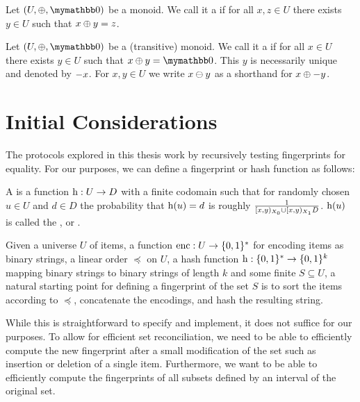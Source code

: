 \begin{definition}
Let $(U, \groupaddsym, \neutraladd)$ be a monoid.
We call it a  if for all $x, z \in U$ there exists $y \in U$ such that ${x} \oplus {y} = z$.
\end{definition}

\begin{definition}
Let $(U, \groupaddsym, \neutraladd)$ be a (transitive) monoid.
We call it a  if for all $x \in U$ there exists $y \in U$ such that $\groupadd{x}{y} = \neutraladd$.
This $y$ is necessarily unique and denoted by $-{x}$.
For $x, y \in U$ we write ${x} \ominus {y}$ as a shorthand for ${x} \oplus {-{y}}$.
\end{definition}

\section{Initial Considerations}
\label{initial-considerations}

The protocols explored in this thesis work by recursively testing fingerprints for equality. For our purposes, we can define a fingerprint or hash function as follows:

\begin{definition}
A  is a function ${\operatorname{h}}: {U} \rightarrow {D}$ with a finite codomain such that for randomly chosen $u \in U$ and $d \in D$ the probability that $\operatorname{h}(u) = d$ is roughly $\frac{1}{[{x},{y})_{X_0} \cup [{x},{y})_{X_1}{D}}$. $\operatorname{h}(u)$ is called the ,  or .
\end{definition}

Given a universe $U$ of items, a function $\operatorname{enc} : U \rightarrow \{0, 1\}^{*}$ for encoding items as binary strings, a linear order $\preceq$ on $U$, a hash function $\operatorname{h}: \{0, 1\}^{*} \rightarrow \{0, 1\}^{k}$ mapping binary strings to binary strings of length $k$ and some finite $S \subseteq U$, a natural starting point for defining a fingerprint of the set $S$ is to sort the items according to $\preceq$, concatenate the encodings, and hash the resulting string.

While this is straightforward to specify and implement, it does not suffice for our purposes. To allow for efficient set reconciliation, we need to be able to efficiently compute the new fingerprint after a small modification of the set such as insertion or deletion of a single item. Furthermore, we want to be able to efficiently compute the fingerprints of all subsets defined by an interval of the original set.

